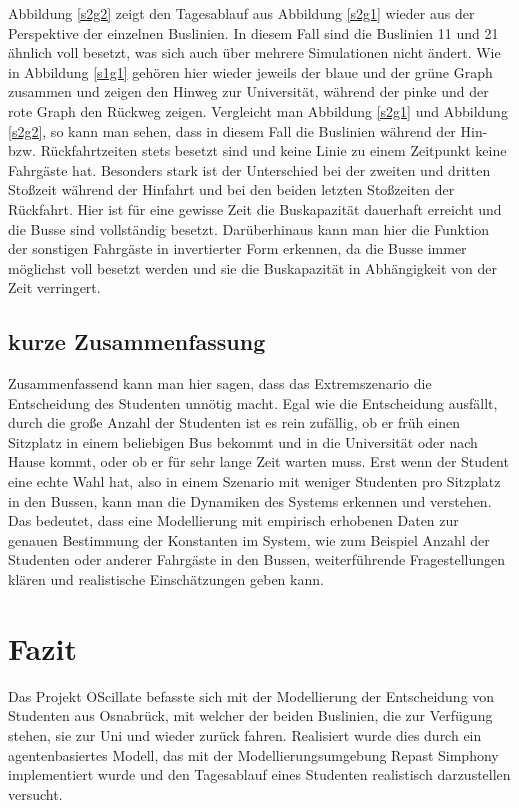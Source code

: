 \documentclass[12pt,a4paper]{scrartcl}
\begin{document}
Abbildung \ref{s2g2} zeigt den Tagesablauf aus Abbildung \ref{s2g1} wieder aus der Perspektive der einzelnen Buslinien. In diesem Fall sind die Buslinien 11 und 21 ähnlich voll besetzt, was sich auch über mehrere Simulationen nicht ändert. Wie in Abbildung \ref{s1g1} gehören hier wieder jeweils der blaue und der grüne Graph zusammen und zeigen den Hinweg zur Universität, während der pinke und der rote Graph den Rückweg zeigen. Vergleicht man Abbildung \ref{s2g1} und Abbildung \ref{s2g2}, so kann man sehen, dass in diesem Fall die Buslinien während der Hin- bzw. Rückfahrtzeiten stets besetzt sind und keine Linie zu einem Zeitpunkt keine Fahrgäste hat. Besonders stark ist der Unterschied bei der zweiten und dritten Stoßzeit während der Hinfahrt und bei den beiden letzten Stoßzeiten der Rückfahrt. Hier ist für eine gewisse Zeit die Buskapazität dauerhaft erreicht und die Busse sind vollständig besetzt. Darüberhinaus kann man hier die Funktion der sonstigen Fahrgäste in invertierter Form erkennen, da die Busse immer möglichst voll besetzt werden und sie die Buskapazität in Abhängigkeit von der Zeit verringert.


\subsection{kurze Zusammenfassung}\label{graphenzsm}
Zusammenfassend kann man hier sagen, dass das Extremszenario die Entscheidung des Studenten unnötig macht. Egal wie die Entscheidung ausfällt, durch die große Anzahl der Studenten ist es rein zufällig, ob er früh einen Sitzplatz in einem beliebigen Bus bekommt und in die Universität oder nach Hause kommt, oder ob er für sehr lange Zeit warten muss. Erst wenn der Student eine echte Wahl hat, also in einem Szenario mit weniger Studenten pro Sitzplatz in den Bussen, kann man die Dynamiken des Systems erkennen und verstehen. Das bedeutet, dass eine Modellierung mit empirisch erhobenen Daten zur genauen Bestimmung der Konstanten im System, wie zum Beispiel Anzahl der Studenten oder anderer Fahrgäste in den Bussen, weiterführende Fragestellungen klären und realistische Einschätzungen geben kann.

\newpage

\section{Fazit}\label{fazit}
Das Projekt OScillate befasste sich mit der Modellierung der Entscheidung von Studenten aus Osnabrück, mit welcher der beiden Buslinien, die zur Verfügung stehen, sie zur Uni und wieder zurück fahren. Realisiert wurde dies durch ein agentenbasiertes Modell, das mit der Modellierungsumgebung Repast Simphony implementiert wurde und den Tagesablauf eines Studenten realistisch darzustellen versucht. 
\end{document}
